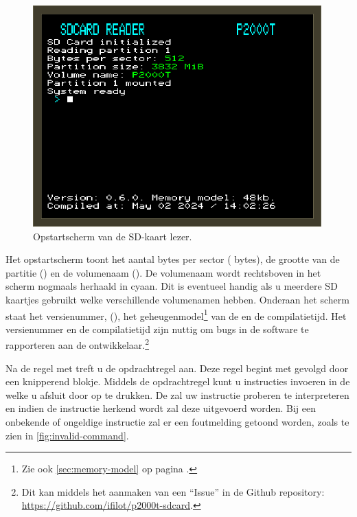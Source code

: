 \begin{figure}[h!]
    \centering
    \includegraphics[width=0.99\textwidth]{img/boot.png}
    \caption{Opstartscherm van de SD-kaart lezer.}
    \label{fig:screenshot-boot}
\end{figure}

Het opstartscherm toont het aantal bytes per sector ( bytes), de grootte van de partitie () en de volumenaam (). De volumenaam wordt rechtsboven in het scherm nogmaals herhaald in cyaan. Dit is eventueel handig als u meerdere SD kaartjes gebruikt welke verschillende volumenamen hebben. Onderaan het scherm staat het versienummer, (), het geheugenmodel\footnote{Zie ook \cref{sec:memory-model} op pagina \pageref{sec:memory-model}.} van de  en de compilatietijd. Het versienummer en de compilatietijd zijn nuttig om bugs in de software te rapporteren aan de ontwikkelaar.\footnote{Dit kan middels het aanmaken van een ``Issue'' in de Github repository: \url{https://github.com/ifilot/p2000t-sdcard}.}

Na de regel met  treft u de opdrachtregel aan. Deze regel begint met \pkc{>} gevolgd door een knipperend blokje. Middels de opdrachtregel kunt u instructies invoeren in de  welke u afsluit door op  te drukken. De \product zal uw instructie proberen te interpreteren en indien de instructie herkend wordt zal deze uitgevoerd worden. Bij een onbekende of ongeldige instructie zal er een foutmelding getoond worden, zoals te zien in \cref{fig:invalid-command}.

